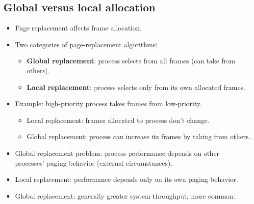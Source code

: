 \subsection{Global versus local allocation}
\begin{itemize}
    \item Page replacement affects frame allocation.
    \item Two categories of page-replacement algorithms:
    \begin{itemize}
        \item \textbf{Global replacement}: process selects from all frames (can take from others).
        \item \textbf{Local replacement}: process selects only from its own allocated frames.
    \end{itemize}
    \item Example: high-priority process takes frames from low-priority.
    \begin{itemize}
        \item Local replacement: frames allocated to process don't change.
        \item Global replacement: process can increase its frames by taking from others.
    \end{itemize}
    \item Global replacement problem: process performance depends on other processes' paging behavior (external circumstances).
    \item Local replacement: performance depends only on its own paging behavior.
    \item Global replacement: generally greater system throughput, more common.
\end{itemize}

